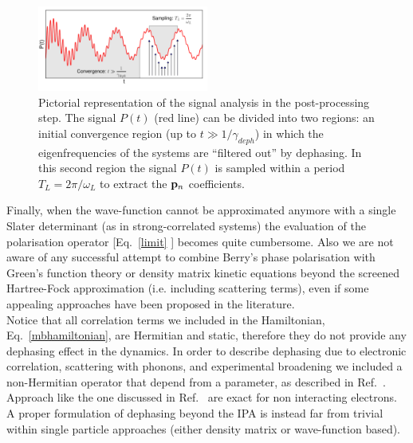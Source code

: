 \begin{figure}
	\includegraphics[width=0.5\textwidth]{Figures/Pt_analysis}
\caption{\footnotesize{Pictorial representation of the signal analysis in the post-processing step. The signal  $P(t)$ (red line) can be divided into two regions: an initial convergence region (up to $t\gg 1/\gamma_{deph}$) in which the eigenfrequencies of the systems are ``filtered out'' by dephasing. In this second region the signal $P(t)$ is sampled within a period $T_L=2\pi/\omega_L$ to extract the ${\bf p}_n$ coefficients. %
	\label{fg:ptanalysis} }} 
\end{figure}
Finally, when the wave-function cannot be approximated anymore with a single Slater determinant (as in strong-correlated systems) the evaluation of the polarisation operator [Eq.~\ref{limit} ] becomes quite cumbersome.\cite{stella} Also we are not aware of any successful attempt to combine Berry's phase polarisation with Green's function theory or density matrix kinetic equations beyond the screened Hartree-Fock approximation (i.e. including scattering terms), even if some appealing approaches have been proposed in the literature\cite{restagw,PhysRevB.84.205137,doi:10.7566/JPSJ.83.033708,nourafkan2013electric}.\\
Notice that all correlation terms we included in the Hamiltonian, Eq.~\ref{mbhamiltonian}, are Hermitian and static, therefore they do not provide any dephasing effect in the dynamics. In order to describe dephasing due to electronic correlation, scattering with phonons, and experimental broadening we included a non-Hermitian operator that depend from a parameter, as described in Ref.~.
Approach like the one discussed in Ref.~ are exact for non interacting electrons. A proper formulation of dephasing beyond the IPA is instead far from trivial within single particle approaches (either density matrix or wave-function based).\cite{sangalli2021excitons}

